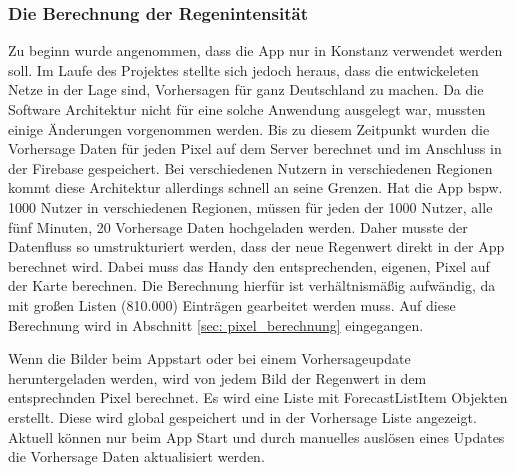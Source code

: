 \subsubsection*{Die Berechnung der Regenintensität}
Zu beginn wurde angenommen, dass die App nur in Konstanz verwendet werden soll. 
Im Laufe des Projektes stellte sich jedoch heraus, dass die entwickeleten Netze in der Lage sind, Vorhersagen 
für ganz Deutschland zu machen. Da die Software Architektur nicht für eine solche Anwendung ausgelegt war, 
mussten einige Änderungen vorgenommen werden. 
Bis zu diesem Zeitpunkt wurden die Vorhersage Daten für jeden Pixel auf dem Server berechnet und im Anschluss in 
der Firebase gespeichert. 
Bei verschiedenen Nutzern in verschiedenen Regionen kommt diese Architektur allerdings schnell an seine Grenzen. 
Hat die App bspw. 1000 Nutzer in verschiedenen Regionen, 
müssen für jeden der 1000 Nutzer, alle fünf Minuten, 20 Vorhersage Daten hochgeladen werden. 
Daher musste der Datenfluss so umstrukturiert werden, dass der neue Regenwert direkt in der App berechnet wird. 
Dabei muss das Handy den entsprechenden, eigenen, Pixel auf der Karte berechnen. 
Die Berechnung hierfür ist verhältnismäßig aufwändig, da mit großen Listen (810.000) Einträgen gearbeitet werden muss.
Auf diese Berechnung wird in Abschnitt \ref{sec: pixel_berechnung} eingegangen. 

Wenn die Bilder beim Appstart oder bei einem Vorhersageupdate heruntergeladen werden, wird von jedem Bild der Regenwert 
in dem entsprechnden Pixel berechnet. 
Es wird eine Liste mit ForecastListItem Objekten erstellt. Diese wird global gespeichert und in der Vorhersage Liste angezeigt. 
Aktuell können nur beim App Start und durch manuelles auslösen eines Updates die Vorhersage Daten aktualisiert werden.   

